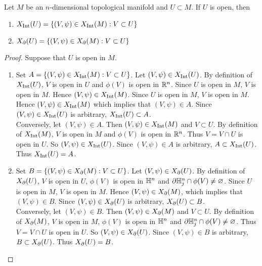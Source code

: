 \documentclass{book}
\begin{document}
	\begin{ex} 
		Let $M$ be an $n$-dimensional topological manifold and $U \subset M$. If $U$ is open, then 
		\begin{enumerate}
			\item $X_{\operatorname{Int}}(U) = \{(V, \psi) \in X_{\operatorname{Int}}(M): V \subset U\}$
			\item $X_{\partial}(U) = \{(V, \psi) \in X_{\partial}(M): V \subset U\}$
		\end{enumerate}
	\end{ex}
	
	\begin{proof}
		Suppose that $U$ is open in $M$.
		\begin{enumerate}
			\item Set $A = \{(V, \psi) \in X_{\operatorname{Int}}(M): V \subset U\}$. Let $(V, \psi) \in X_{\operatorname{Int}}(U)$. By definition of $X_{\operatorname{Int}}(U)$, $V$ is open in $U$ and $\phi(V)$ is open in $\mathbb{R}^n$. Since $U$ is open in $M$, $V$ is open in $M$. Hence $(V, \psi) \in X_{\operatorname{Int}}(M)$. Since $U$ is open in $M$, $V$ is open in $M$. Hence $(V, \psi) \in X_{\operatorname{Int}}(M)$ which implies that $(V, \psi) \in A$. Since $(V, \psi) \in X_{\operatorname{Int}}(U)$ is arbitrary, $X_{\operatorname{Int}}(U) \subset A$. \\
			Conversely, let $(V, \psi) \in A$. Then $(V, \psi) \in X_{\operatorname{Int}}(M)$ and $V \subset U$. By definition of $X_{\operatorname{Int}}(M)$, $V$ is open in $M$ and $\phi(V)$ is open in $\mathbb{R}^n$. Thus $V = V \cap U$ is open in $U$. So $(V, \psi) \in X_{\operatorname{Int}}(U)$. Since $(V, \psi) \in A$ is arbitrary, $A \subset X_{\operatorname{Int}}(U)$. Thus $X_{\operatorname{Int}}(U) = A$.
			
			\item Set $B = \{(V, \psi) \in X_{\partial}(M): V \subset U\}$. Let $(V, \psi) \in X_{\partial}(U)$. By definition of $X_{\partial}(U)$, $V$ is open in $U$, $\phi(V)$ is open in $\mathbb{H}^n$ and $\partial \mathbb{H}^n_j \cap \phi(V) \neq \varnothing$. Since $U$ is open in $M$, $V$ is open in $M$. Hence $(V, \psi) \in X_{\partial}(M)$, which implies that $(V, \psi) \in B$. Since $(V, \psi) \in X_{\partial}(U)$ is arbitrary, $X_{\partial}(U) \subset B$. \\
			Conversely, let $(V, \psi) \in B$. Then $(V, \psi) \in X_{\partial}(M)$ and $V \subset U$. By definition of $X_{\partial}(M)$, $V$ is open in $M$, $\phi(V)$ is open in $\mathbb{H}^n$ and $\partial \mathbb{H}^n_j \cap \phi(V) \neq \varnothing$. Thus $V = V \cap U$ is open in $U$. So $(V, \psi) \in X_{\partial}(U)$. Since $(V, \psi) \in B$ is arbitrary, $B \subset X_{\partial}(U)$. Thus $X_{\partial}(U) = B$.
		\end{enumerate}
	\end{proof}
	
\end{document}
